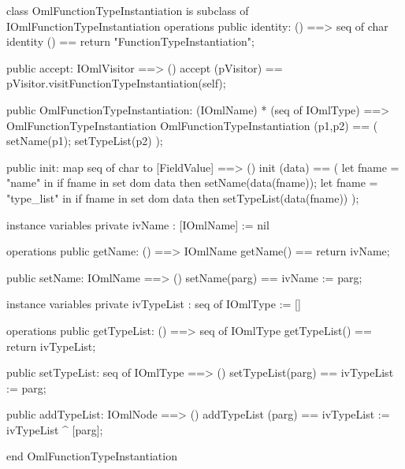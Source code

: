\begin{vdm_al}
class OmlFunctionTypeInstantiation is subclass of IOmlFunctionTypeInstantiation
operations
  public identity: () ==> seq of char
  identity () == return "FunctionTypeInstantiation";

  public accept: IOmlVisitor ==> ()
  accept (pVisitor) == pVisitor.visitFunctionTypeInstantiation(self);

  public OmlFunctionTypeInstantiation:
      (IOmlName) *
      (seq of IOmlType) ==> OmlFunctionTypeInstantiation
  OmlFunctionTypeInstantiation (p1,p2) == 
   ( setName(p1);
     setTypeList(p2) );

  public init: map seq of char to [FieldValue] ==> ()
  init (data) ==
    ( let fname = "name" in
        if fname in set dom data
        then setName(data(fname));
      let fname = "type_list" in
        if fname in set dom data
        then setTypeList(data(fname)) );

instance variables
  private ivName : [IOmlName] := nil

operations
  public getName: () ==> IOmlName
  getName() == return ivName;

  public setName: IOmlName ==> ()
  setName(parg) == ivName := parg;

instance variables
  private ivTypeList : seq of IOmlType := []

operations
  public getTypeList: () ==> seq of IOmlType
  getTypeList() == return ivTypeList;

  public setTypeList: seq of IOmlType ==> ()
  setTypeList(parg) == ivTypeList := parg;

  public addTypeList: IOmlNode ==> ()
  addTypeList (parg) == ivTypeList := ivTypeList ^ [parg];

end OmlFunctionTypeInstantiation
\end{vdm_al}

